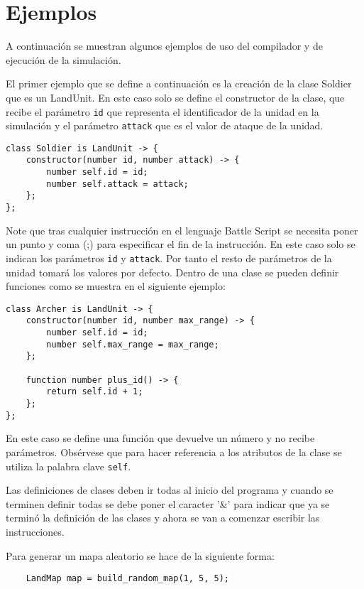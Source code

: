 \section{Ejemplos}

A continuación se muestran algunos ejemplos de uso del compilador y de ejecución de la simulación.

El primer ejemplo que se define a continuación es la creación de la clase Soldier que es un LandUnit. En este caso solo se define el constructor de la clase, que recibe el parámetro \verb|id| que representa el identificador de la unidad en la simulación y el par\'ametro \verb|attack| que es el valor de ataque de la unidad.

\begin{verbatim}
class Soldier is LandUnit -> {  
    constructor(number id, number attack) -> {
        number self.id = id;
        number self.attack = attack;
    };
}; 
\end{verbatim}

Note que tras cualquier instrucción en el lenguaje Battle Script se necesita poner un punto y coma (;) para especificar el fin de la instrucción. En este caso solo se indican los par\'ametros \verb|id| y \verb|attack|. Por tanto el resto de par\'ametros de la unidad tomar\'a los valores por defecto. Dentro de una clase se pueden definir funciones como se muestra en el siguiente ejemplo:

\begin{verbatim}
class Archer is LandUnit -> {
    constructor(number id, number max_range) -> {
        number self.id = id;
        number self.max_range = max_range;
    };
		
    function number plus_id() -> {
        return self.id + 1;
    };
};
\end{verbatim}

En este caso se define una funci\'on que devuelve un n\'umero y no recibe par\'ametros. Obs\'ervese que para hacer referencia a los atributos de la clase se utiliza la palabra clave \verb|self|.

Las definiciones de clases deben ir todas al inicio del programa y cuando se terminen definir todas se debe poner el caracter '\&' para indicar que ya se termin\'o la definici\'on de las clases y ahora se van a comenzar escribir las instrucciones.

Para generar un mapa aleatorio se hace de la siguiente forma:

\begin{verbatim}
	LandMap map = build_random_map(1, 5, 5);
\end{verbatim} 

